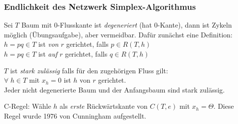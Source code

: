 \subsubsection{Endlichkeit des Netzwerk Simplex-Algorithmus}

Sei $T$ Baum mit 0-Flusskante ist {\em degeneriert} (hat 0-Kante), dann ist
Zykeln möglich (Übungsaufgabe), aber vermeidbar. Dafür zunächst eine
Definition:\\
$h=p q \in T$ ist {\em von} $r$ gerichtet, falls $p \in R(T,h)$\\
$h=p q \in T$ ist {\em auf} $r$ gerichtet, falls $q \in R(T,h)$

$T$ ist {\em stark zulässig} falls für den zugehörigen Fluss gilt:\\
$\forall \; h \in T$ mit $x_{h} =0$ ist $h$ von $r$ gerichtet.\\ 

Jeder nicht degenerierte Baum und der Anfangsbaum sind stark zulässig.

C-Regel: Wähle $h$ als {\em erste} Rückwärtskante von $C(T,e)$ mit $x_{h} =
\Theta$. Diese Regel wurde 1976 von Cunningham aufgestellt.

